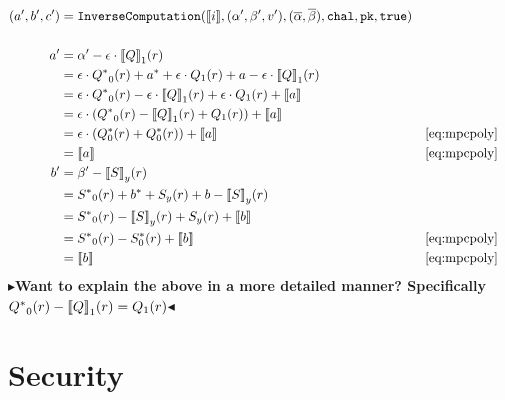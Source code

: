 \documentclass[twoside,11pt]{report}
\theoremstyle{definition}
\theoremstyle{plain}
\newcommand{\todo}[1]{{\color[rgb]{.5,0,0}\textbf{$\blacktriangleright$#1$\blacktriangleleft$}}}
\begin{document}
\begin{align*}
  (a', b', c') & = \texttt{InverseComputation}(\sh{i}, (\alpha', \beta', v'),
  (\overline{\alpha}, \overline{\beta}), \texttt{chal}, \texttt{pk}, \texttt{true})                                                     \\\\
  a'           & = \alpha' - \epsilon \cdot {\sh{Q}}_1(r)                                                                               \\
               & = \epsilon \cdot {Q^*}_0(r) + a^* + \epsilon \cdot Q_1(r) + a - \epsilon \cdot {\sh{Q}}_1(r)                           \\
               & = \epsilon \cdot {Q^*}_0(r) - \epsilon \cdot {\sh{Q}}_1(r) + \epsilon \cdot Q_1(r) + \sh{a}                            \\
               & = \epsilon \cdot ({Q^*}_0(r) - {\sh{Q}}_1(r) +  Q_1(r)) + \sh{a}                                                       \\
               & = \epsilon \cdot (Q^*_0(r) +  Q^*_0(r)) + \sh{a}                                             &  & \autoref{eq:mpcpoly} \\
               & = \sh{a}                                                                                     &  & \autoref{eq:mpcpoly} \\
  b'           & = \beta' - {\sh{S}}_y(r)                                                                                               \\
               & = {S^*}_0(r) + b^* + S_y(r) + b - {\sh{S}}_y(r)                                                                        \\
               & = {S^*}_0(r) - {\sh{S}}_y(r) + S_y(r)  + \sh{b}                                                                        \\
               & = {S^*}_0(r) - S^*_0(r)  + \sh{b}                                                            &  & \autoref{eq:mpcpoly} \\
               & = \sh{b}                                                                                     &  & \autoref{eq:mpcpoly} \\
\end{align*}
\todo{Want to explain the above in a more detailed manner? Specifically ${Q^*}_0(r) - {\llbracket Q \rrbracket}_1(r) = Q_1(r)$}

\section{Security}
\end{document}
